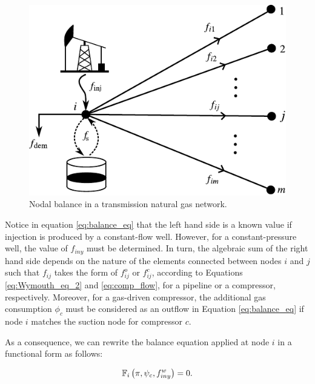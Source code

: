 \begin{figure}[!ht]
	\centering
	\includegraphics[scale=0.95]{Figures/Gas_flow_problem}
	\caption{Nodal balance in a transmission natural gas network.}	
	\label{fig:nodal_balance}
\end{figure}

Notice in equation \ref{eq:balance_eq} that the left hand side is a known value if injection is produced by a constant-flow well. However, for a constant-pressure well, the value of $f_{iny}$ must be determined. In turn, the algebraic sum of the right hand side depends on the nature of the elements connected between nodes $i$ and $j$ such that $f_{ij}$ takes the form of $f_{ij}^o$ or $f_{ij}^c$, according to Equations \ref{eq:Wymouth_eq_2} and \ref{eq:comp_flow}, for a pipeline or a compressor, respectively. Moreover, for a gas-driven compressor, the additional gas consumption $\phi_c$ must be considered as an outflow in Equation \ref{eq:balance_eq} if node $i$ matches the suction node for compressor $c$.


As a consequence, we can rewrite the balance equation applied at node $i$ in a functional form as follows:

\begin{equation}
	\label{eq:balance_eq_funtional}
	\mathbb{F}_i\left(\pi,\psi_c,f_{iny}^{w}\right) = 0.
	\vspace{0.3cm}
\end{equation}

